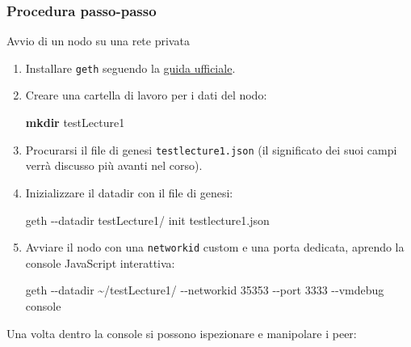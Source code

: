 \documentclass[
  italian,
  openany]{book}
\newenvironment{Shaded}{\begin{snugshade}}{\end{snugshade}}
\newcommand{\AttributeTok}[1]{\textcolor[rgb]{0.13,0.29,0.53}{#1}}
\newcommand{\ExtensionTok}[1]{#1}
\newcommand{\FunctionTok}[1]{\textcolor[rgb]{0.13,0.29,0.53}{\textbf{#1}}}
\newcommand{\NormalTok}[1]{#1}
\begin{document}
\subsubsection{Procedura passo-passo}\label{procedura-passo-passo}

\begin{callouttip}{Avvio di un nodo su una rete privata}

\begin{enumerate}
\def\labelenumi{\arabic{enumi}.}
\item
  Installare \texttt{geth} seguendo la
  \href{https://geth.ethereum.org/docs/getting-started/installing-geth}{guida
  ufficiale}.
\item
  Creare una cartella di lavoro per i dati del nodo:

\begin{Shaded}
\begin{Highlighting}[]
\FunctionTok{mkdir}\NormalTok{ testLecture1}
\end{Highlighting}
\end{Shaded}
\item
  Procurarsi il file di genesi \texttt{testlecture1.json} (il
  significato dei suoi campi verrà discusso più avanti nel corso).
\item
  Inizializzare il datadir con il file di genesi:

\begin{Shaded}
\begin{Highlighting}[]
\ExtensionTok{geth} \AttributeTok{{-}{-}datadir}\NormalTok{ testLecture1/ init testlecture1.json}
\end{Highlighting}
\end{Shaded}
\item
  Avviare il nodo con una \texttt{networkid} custom e una porta
  dedicata, aprendo la console JavaScript interattiva:

\begin{Shaded}
\begin{Highlighting}[]
\ExtensionTok{geth} \AttributeTok{{-}{-}datadir}\NormalTok{ \textasciitilde{}/testLecture1/ }\AttributeTok{{-}{-}networkid}\NormalTok{ 35353 }\AttributeTok{{-}{-}port}\NormalTok{ 3333 }\AttributeTok{{-}{-}vmdebug}\NormalTok{ console}
\end{Highlighting}
\end{Shaded}
\end{enumerate}

\end{callouttip}

Una volta dentro la console si possono ispezionare e manipolare i peer:
\end{document}
